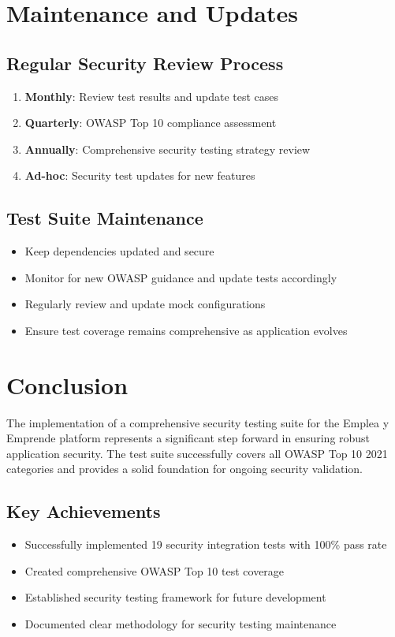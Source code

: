 \documentclass[12pt]{article}
\begin{document}
\section{Maintenance and Updates}

\subsection{Regular Security Review Process}

\begin{enumerate}
    \item \textbf{Monthly}: Review test results and update test cases
    \item \textbf{Quarterly}: OWASP Top 10 compliance assessment
    \item \textbf{Annually}: Comprehensive security testing strategy review
    \item \textbf{Ad-hoc}: Security test updates for new features
\end{enumerate}

\subsection{Test Suite Maintenance}

\begin{itemize}
    \item Keep dependencies updated and secure
    \item Monitor for new OWASP guidance and update tests accordingly
    \item Regularly review and update mock configurations
    \item Ensure test coverage remains comprehensive as application evolves
\end{itemize}

\section{Conclusion}

The implementation of a comprehensive security testing suite for the Emplea y Emprende platform represents a significant step forward in ensuring robust application security. The test suite successfully covers all OWASP Top 10 2021 categories and provides a solid foundation for ongoing security validation.

\subsection{Key Achievements}
\begin{itemize}
    \item Successfully implemented 19 security integration tests with 100\% pass rate
    \item Created comprehensive OWASP Top 10 test coverage
    \item Established security testing framework for future development
    \item Documented clear methodology for security testing maintenance
\end{itemize}
\end{document}
